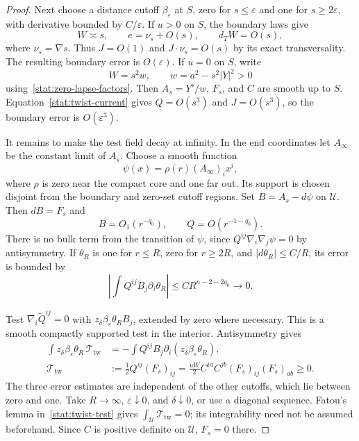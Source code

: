 \begin{proof}
Next choose a distance cutoff $\beta_\varepsilon$ at $S$, zero for
$s\leq\varepsilon$ and one for $s\geq2\varepsilon$, with derivative
bounded by $C/\varepsilon$.  If $u>0$ on $S$, the boundary laws give
\[
 W\asymp s,\qquad e=\nu_s+O(s),\qquad d_TW=O(s),
\]
where $\nu_s=\nabla s$.  Thus $J=O(1)$ and
$J\cdot\nu_s=O(s)$ by its exact transversality.  The resulting
boundary error is $O(\varepsilon)$.  If $u=0$ on $S$, write
\[
 W=s^2w,\qquad w=a^2-s^2|Y|^2>0
\]
using~\eqref{stat:zero-lapse-factors}.  Then
$A_s=Y^\flat/w$, $F_s$, and $C$ are smooth up to $S$.
Equation~\eqref{stat:twist-current} gives $Q=O(s^3)$ and
$J=O(s^3)$, so the boundary error is $O(\varepsilon^3)$.

It remains to make the test field decay at infinity.  In the end
coordinates let $A_\infty$ be the constant limit of $A_s$.  Choose
a smooth function
\[
 \psi(x)=\rho(r)(A_\infty)_ix^i,
\]
where $\rho$ is zero near the compact core and one far out.  Its
support is chosen disjoint from the boundary and zero-set cutoff
regions.  Set $B=A_s-d\psi$ on $\mathcal U$.  Then $dB=F_s$ and
\begin{equation}
 B=O_1(r^{-q_0}),\qquad Q=O(r^{-1-q_0}).
 \label{stat:twist-end-decay}
\end{equation}
There is no bulk term from the transition of $\psi$, since
$Q^{ij}\nabla_i\nabla_j\psi=0$ by antisymmetry.  If $\theta_R$ is
one for $r\leq R$, zero for $r\geq2R$, and
$|d\theta_R|\leq C/R$, its error is bounded by
\begin{equation}
 \left|\int Q^{ij}B_j\partial_i\theta_R\right|
       \leq C R^{n-2-2q_0}\longrightarrow0.
 \label{stat:twist-infinity-error}
\end{equation}

Test $\nabla_i\widetilde Q^{ij}=0$ with
$z_\delta\beta_\varepsilon\theta_R B_j$, extended by zero where
necessary.  This is a smooth compactly supported test in the
interior.  Antisymmetry gives
\begin{align}
 \int z_\delta\beta_\varepsilon\theta_R\,\mathcal T_{\mathrm{tw}}
   &=-\int Q^{ij}B_j
         \partial_i(z_\delta\beta_\varepsilon\theta_R),
 \label{stat:twist-test}\\
 \mathcal T_{\mathrm{tw}}
   &:=\frac12 Q^{ij}(F_s)_{ij}
    =\frac{uW}{2}C^{ia}C^{jb}(F_s)_{ij}(F_s)_{ab}\geq0.
 \label{stat:twist-density}
\end{align}
The three error estimates are independent of the other cutoffs,
which lie between zero and one.  Take $R\to\infty$,
$\varepsilon\downarrow0$, and $\delta\downarrow0$, or use a
diagonal sequence.  Fatou's lemma in~\eqref{stat:twist-test} gives
$\int_{\mathcal U}\mathcal T_{\mathrm{tw}}=0$; its integrability need not be
assumed beforehand.  Since $C$ is positive definite on
$\mathcal U$, $F_s=0$ there.
\end{proof}

